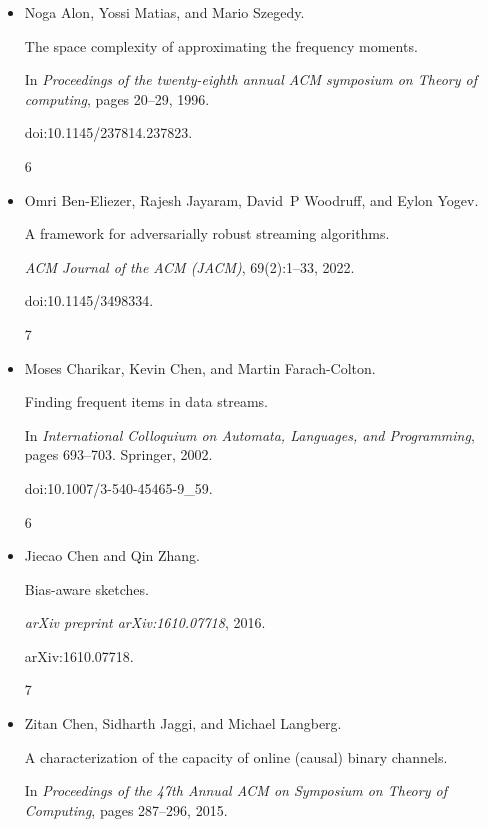 \documentclass[10pt,a4paper]{article}
\begin{document}
\begin{itemize}


\item[] 
[1]

Noga Alon, Yossi Matias, and Mario Szegedy.


The space complexity of approximating the frequency moments.


In \emph{Proceedings of the twenty-eighth annual ACM symposium on
Theory of computing}, pages 20–29, 1996.


doi:10.1145/237814.237823.


6




\item[] 
[2]

Omri Ben-Eliezer, Rajesh Jayaram, David P Woodruff, and Eylon Yogev.


A framework for adversarially robust streaming algorithms.


\emph{ACM Journal of the ACM (JACM)}, 69(2):1–33, 2022.


doi:10.1145/3498334.


7




\item[] 
[3]

Moses Charikar, Kevin Chen, and Martin Farach-Colton.


Finding frequent items in data streams.


In \emph{International Colloquium on Automata, Languages, and
Programming}, pages 693–703. Springer, 2002.


doi:10.1007/3-540-45465-9\_59.


6




\item[] 
[4]

Jiecao Chen and Qin Zhang.


Bias-aware sketches.


\emph{arXiv preprint arXiv:1610.07718}, 2016.


arXiv:1610.07718.


7




\item[] 
[5]

Zitan Chen, Sidharth Jaggi, and Michael Langberg.


A characterization of the capacity of online (causal) binary
channels.


In \emph{Proceedings of the 47th Annual ACM on Symposium on Theory
of Computing}, pages 287–296, 2015.



\end{itemize}
\end{document}
